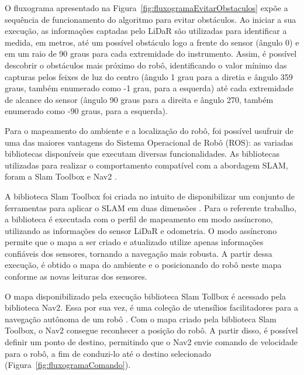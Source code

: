 \newpage

O fluxograma apresentado na Figura~\ref{fig:fluxogramaEvitarObstaculos} expõe a sequência de funcionamento do algoritmo para evitar obstáculos. Ao iniciar a sua execução, as informações captadas pelo LiDaR são utilizadas para identificar a medida, em metros, até um possível obstáculo logo a frente do sensor (ângulo 0) e em um raio de 90 graus para cada extremidade do instrumento. Assim, é possível descobrir o obstáculos mais próximo do robô, identificando o valor mínimo das capturas pelos feixes de luz do centro (ângulo  1 grau para a diretia e ângulo 359 graus, também enumerado como -1 grau, para a esquerda) até cada extremidade de alcance do sensor (ângulo 90 graus para a direita e ângulo 270, também enumerado como -90 graus, para a esquerda).

Para o mapeamento do ambiente e a localização do robô, foi possível usufruir de uma das maiores vantagens do Sistema Operacional de Robô (ROS): as variadas bibliotecas disponíveis que executam diversas funcionalidades. As bibliotecas utilizadas para realizar o comportamento compatível com a abordagem SLAM, foram a  Slam Toolbox  e Nav2 \cite{nav2, slamtoolbox}.

A biblioteca Slam Toolbox foi criada no intuito de disponibilizar um conjunto de ferramentas para aplicar o SLAM em duas dimensões \cite{slamtoolbox}. Para o referente trabalho, a biblioteca é executada com o perfil de mapeamento em modo assíncrono, utilizando as informações do sensor LiDaR e odometria.  O modo assíncrono permite que o mapa a ser criado e atualizado utilize apenas informações confiáveis dos sensores, tornando a navegação mais robusta. A partir dessa execução, é obtido o mapa do ambiente e o posicionando do robô neste mapa conforme as novas leituras dos sensores.

O mapa disponibilizado pela execução biblioteca Slam Tollbox é acessado pela biblioteca Nav2. Essa por sua vez, é uma coleção de utensílios facilitadores para a navegação autônoma de um robô \cite{nav2}. Com o mapa criado pela biblioteca Slam Toolbox, o Nav2 consegue reconhecer a posição do robô. A partir disso, é possível definir um ponto de destino, permitindo que o Nav2  envie comando de velocidade  para o robô, a fim de conduzi-lo até o destino selecionado (Figura~\ref{fig:fluxogramaComando}).

